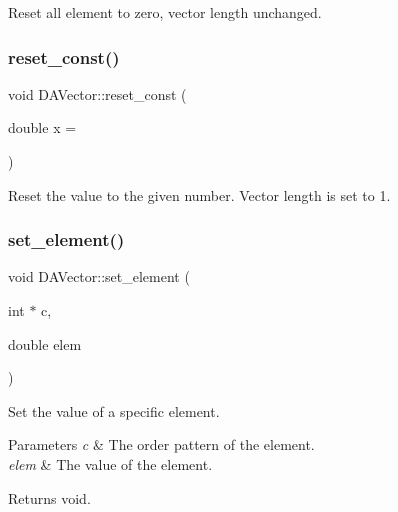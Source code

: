 Reset all element to zero, vector length unchanged. \mbox{\label{struct_d_a_vector_a104928f5ba59b6ce42636646670048c4}} 
\subsubsection{\texorpdfstring{reset\_const()}{reset\_const()}}
{\footnotesize\ttfamily void D\+A\+Vector\+::reset\+\_\+const (\begin{DoxyParamCaption}\item[{double}]{x = {} }\end{DoxyParamCaption})}



Reset the value to the given number. Vector length is set to 1. 

\mbox{\label{struct_d_a_vector_a08078f536d095d8c7423ea2989a7854c}} 
\subsubsection{\texorpdfstring{set\_element()}{set\_element()}\hspace{0.1cm}{\footnotesize\ttfamily [1/2]}}
{\footnotesize\ttfamily void D\+A\+Vector\+::set\+\_\+element (\begin{DoxyParamCaption}\item[{int $\ast$}]{c,  }\item[{double}]{elem }\end{DoxyParamCaption})}



Set the value of a specific element. 


\begin{DoxyParams}{Parameters}
{\em c} & The order pattern of the element. \\
\hline
{\em elem} & The value of the element. \\
\hline
\end{DoxyParams}
\begin{DoxyReturn}{Returns}
void. 
\end{DoxyReturn}
\mbox{\label{struct_d_a_vector_a4403b07be6cfbac43bfa05fef187caab}} 
